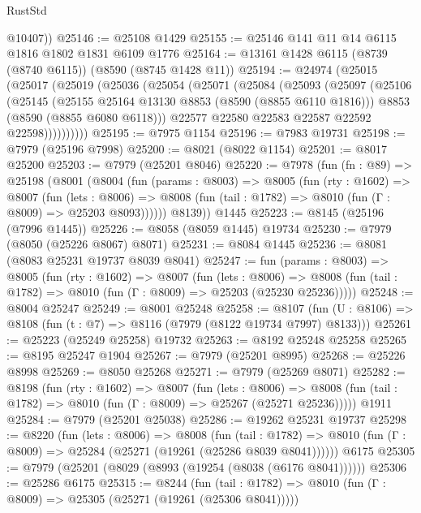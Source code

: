 \begin{lexlean}{RustStd}
\begin{coremodule}
        @10407))
@25146 := @25108 @1429
@25155 := @25146 @141 @11 @14 @6115 @1816 @1802 @1831 @6109 @1776
@25164 := @13161 @1428 @6115 (@8739 (@8740 @6115)) (@8590 (@8745 @1428 @11))
@25194 := @24974
    (@25015
      (@25017
        (@25019
          (@25036
            (@25054
              (@25071
                (@25084
                  (@25093
                    (@25097
                      (@25106
                        (@25145
                          (@25155 @25164 @13130 @8853 (@8590 (@8855 @6110 @1816)))
                          @8853
                          (@8590 (@8855 @6080 @6118)))
                        @22577
                        @22580
                        @22583
                        @22587
                        @22592
                        @22598))))))))))
@25195 := @7975 @1154
@25196 := @7983 @19731
@25198 := @7979 (@25196 @7998)
@25200 := @8021 (@8022 @1154)
@25201 := @8017 @25200
@25203 := @7979 (@25201 @8046)
@25220 := @7978
    (fun (fn : @89) =>
    @25198
      (@8001
        (@8004
          (fun (params : @8003) =>
          @8005
            (fun (rty : @1602) =>
            @8007
              (fun (lets : @8006) =>
              @8008 (fun (tail : @1782) => @8010 (fun (Γ : @8009) => @25203 @8093))))))
        @8139))
    @1445
@25223 := @8145 (@25196 (@7996 @1445))
@25226 := @8058 (@8059 @1445) @19734
@25230 := @7979 (@8050 (@25226 @8067) @8071)
@25231 := @8084 @1445
@25236 := @8081 (@8083 @25231 @19737 @8039 @8041)
@25247 := fun (params : @8003) =>
  @8005
    (fun (rty : @1602) =>
    @8007
      (fun (lets : @8006) =>
      @8008 (fun (tail : @1782) => @8010 (fun (Γ : @8009) => @25203 (@25230 @25236)))))
@25248 := @8004 @25247
@25249 := @8001 @25248
@25258 := @8107
    (fun (U : @8106) => @8108 (fun (t : @7) => @8116 (@7979 (@8122 @19734 @7997) @8133)))
@25261 := @25223 (@25249 @25258) @19732
@25263 := @8192 @25248 @25258
@25265 := @8195 @25247 @1904
@25267 := @7979 (@25201 @8995)
@25268 := @25226 @8998
@25269 := @8050 @25268
@25271 := @7979 (@25269 @8071)
@25282 := @8198
    (fun (rty : @1602) =>
    @8007
      (fun (lets : @8006) =>
      @8008 (fun (tail : @1782) => @8010 (fun (Γ : @8009) => @25267 (@25271 @25236)))))
    @1911
@25284 := @7979 (@25201 @25038)
@25286 := @19262 @25231 @19737
@25298 := @8220
    (fun (lets : @8006) =>
    @8008
      (fun (tail : @1782) =>
      @8010 (fun (Γ : @8009) => @25284 (@25271 (@19261 (@25286 @8039 @8041))))))
    @6175
@25305 := @7979 (@25201 (@8029 (@8993 (@19254 (@8038 (@6176 @8041))))))
@25306 := @25286 @6175
@25315 := @8244
    (fun (tail : @1782) => @8010 (fun (Γ : @8009) => @25305 (@25271 (@19261 (@25306 @8041)))))

\end{coremodule}
\end{lexlean}
